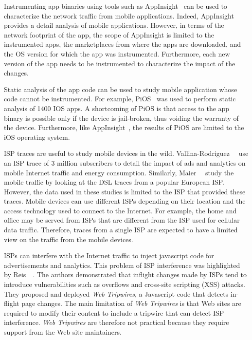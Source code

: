 Instrumenting app binaries using tools such as AppInsight~\cite{ravindranath:appinsight} can be used to characterize the network traffic from mobile applications. 
Indeed, AppInsight provides a detail analysis of mobile applications.
However, in terms of the network footprint of the app, the scope of AppInsight is limited to the instrumented apps, the marketplaces from where the apps are downloaded, and the OS version for which the app was instrumented.
Furthermore, each new version of the app needs to be instrumented to characterize the impact of the changes.

Static analysis of the app code can be used to study mobile application whose code cannot be instrumented. 
For example, PiOS~\cite{egele:pios} was used to perform static analysis of 1400 IOS apps. 
A shortcoming of PiOS is that access to the app binary is possible only if the device is jail-broken, thus voiding the warranty of the device.
Furthermore, like AppInsight~\cite{ravindranath:appinsight}, the results of PiOS are limited to the iOS operating system. 

ISP traces are useful to study mobile devices in the wild. 
Vallina-Rodriguez~\etal~\cite{vallina-rod:ads} use an ISP trace of 3 million subscribers to detail the impact of ads and analytics on mobile Internet traffic and energy consumption. 
Similarly, Maier~\etal~\cite{maier:mobtraffic} study the mobile traffic by looking at the DSL traces from a popular European ISP. 
However, the data used in these studies is limited to the ISP that provided these traces.
Mobile devices can use different ISPs depending on their location and the access technology used to connect to the Internet. 
For example, the home \wifi and office \wifi may be served from ISPs that are different from the ISP used for cellular data traffic.
Therefore, traces from a single ISP are expected to have a limited view on the traffic from the mobile devices.

ISPs can interfere with the Internet traffic to inject javascript code for advertisements and analytics.
This problem of ISP interference was highlighted by Reis~\etal~\cite{reis:tripwires}. 
The authors demonstrated that inflight changes made by ISPs tend to introduce vulnerabilities such as overflows and cross-site scripting (XSS) attacks. 
They proposed and deployed \emph{Web Tripwires}, a Javascript code that detects in-flight page changes. 
The main limitation of \emph{Web Tripwires} is that Web sites are required to modify their content to include a tripwire that can detect ISP interference. 
\emph{Web Tripwires} are therefore not practical because they require support from the Web site maintainers.

